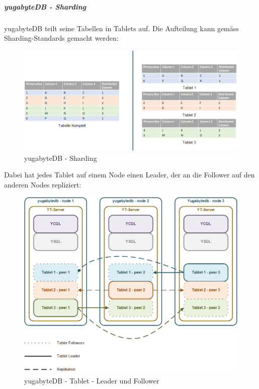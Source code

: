 \begin{flushleft}
    \subparagraph{yugabyteDB - Sharding}
    yugabyteDB teilt seine Tabellen in Tablets auf.
    Die Aufteilung kann gemäss Sharding-Standards gemacht werden:
    \begin{figure}[H]
        \centering
        \includegraphics[width=0.8\linewidth]{source/implementation/evaluation/postgresql_ha_solutions/yugabytedb/yugabytedb-sharding-tablets}
        \caption{yugabyteDB - Sharding}
        \label{fig:yugabytedb-sharding-tablets}
    \end{figure}
\end{flushleft}
\begin{flushleft}
    Dabei hat jedes Tablet auf einem Node einen Leader, der an die Follower auf den anderen Nodes repliziert:
    \begin{figure}[H]
        \centering
        \includegraphics[width=0.8\linewidth]{source/implementation/evaluation/postgresql_ha_solutions/yugabytedb/yugabytedb-tablet-masters}
        \caption{yugabyteDB - Tablet - Leader und Follower}
        \label{fig:yugabytedb-tablet-masters}
    \end{figure}
\end{flushleft}
